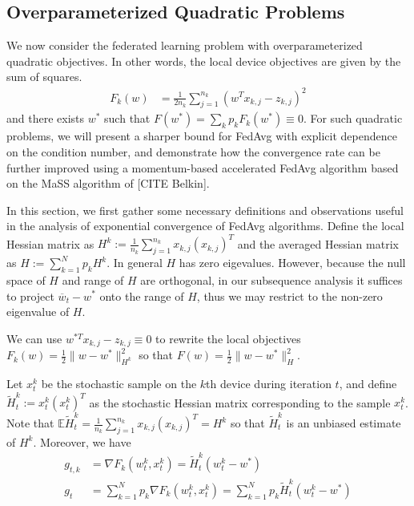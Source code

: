 \subsection{Overparameterized Quadratic Problems}

We now consider the federated learning problem with overparameterized
quadratic objectives. In other words, the local device objectives
are given by the sum of squares. 
\begin{align*}
F_{k}(w) & =\frac{1}{2n_{k}}\sum\nolimits_{j=1}^{n_{k}}(w^{T}x_{k,j}-z_{k,j})^{2}
\end{align*}
and there exists $w^{\ast}$ such that $F(w^{\ast})=\sum_{k}p_{k}F_{k}(w^{\ast})\equiv0$.
For such quadratic problems, we will present a sharper bound for FedAvg
with explicit dependence on the condition number, and demonstrate
how the convergence rate can be further improved using a momentum-based
accelerated FedAvg algorithm based on the MaSS algorithm of {[}CITE
Belkin{]}. 

In this section, we first gather some necessary definitions and observations
useful in the analysis of exponential convergence of FedAvg algorithms.
Define the local Hessian matrix as $H^{k}:=\frac{1}{n_{k}}\sum_{j=1}^{n_{k}}x_{k,j}(x_{k,j})^{T}$
and the averaged Hessian matrix as $H:=\sum_{k=1}^{N}p_{k}H^{k}$.
In general $H$ has zero eigevalues. However, because the null space
of $H$ and range of $H$ are orthogonal, in our subsequence analysis
it suffices to project $\overline{w}_{t}-w^{\ast}$ onto the range
of $H$, thus we may restrict to the non-zero eigenvalue of $H$. 

We can use $w^{\ast T}x_{k,j}-z_{k,j}\equiv0$ to rewrite the local
objectives $F_{k}(w)=\frac{1}{2}\|w-w^{\ast}\|_{H^{k}}^{2}$ so that
$F(w)=\frac{1}{2}\|w-w^{\ast}\|_{H}^{2}$. %
\begin{comment}
\begin{align*}
F_{k}(w) & =\frac{1}{2n_{k}}\sum_{j=1}^{n_{k}}(w^{T}x_{k,j}-z_{k,j}-(w^{\ast T}x_{k,j}-z_{k,j}))^{2}=\frac{1}{2n_{k}}\sum_{j=1}^{n_{k}}((w-w^{\ast})^{T}x_{k,j})^{2}\\
& =\frac{1}{2}\langle w-w^{\ast},H^{k}(w-w^{\ast})\rangle=\frac{1}{2}\|w-w^{\ast}\|_{H^{k}}^{2}
\end{align*}
\end{comment}

Let $x_{t}^{k}$ be the stochastic sample on the $k$th device during
iteration $t$, and define $\tilde{H}_{t}^{k}:=x_{t}^{k}(x_{t}^{k})^{T}$
as the stochastic Hessian matrix corresponding to the sample $x_{t}^{k}$.
Note that $\mathbb{E}\tilde{H}_{t}^{k}=\frac{1}{n_{k}}\sum_{j=1}^{n_{k}}x_{k,j}(x_{k,j})^{T}=H^{k}$
so that $\tilde{H}_{t}^{k}$ is an unbiased estimate of $H^{k}$.
Moreover, we have
\begin{align*}
g_{t,k} & =\nabla F_{k}(w_{t}^{k},x_{t}^{k})=\tilde{H}_{t}^{k}(w_{t}^{k}-w^{\ast})\\
g_{t} & =\sum\nolimits_{k=1}^{N}p_{k}\nabla F_{k}(w_{t}^{k},x_{t}^{k})=\sum\nolimits_{k=1}^{N}p_{k}\tilde{H}_{t}^{k}(w_{t}^{k}-w^{\ast})
\end{align*}

